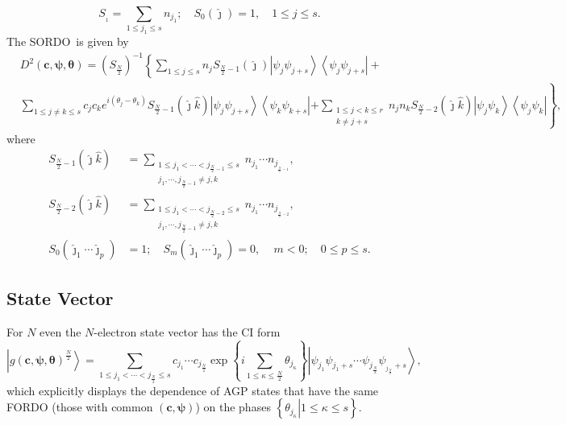 \documentclass[aps,preprint]{revtex4}%
\begin{document}
\begin{equation}
S_{_{1}}=\sum_{1\leq j_{1}\leq s}n_{j_{1}};\quad S_{0}\left(  \hat{\jmath
}\right)  =1,\quad1\leq j\leq s.
\end{equation}
The SORDO\ is given by
\begin{align}
&  D^{2}\left(  \boldsymbol{c},\boldsymbol{\psi},\boldsymbol{\theta}\right)
=\left(  S_{\frac{N}{2}}\right)  ^{-1}\left\{  \sum_{1\leq j\leq s}%
n_{j}S_{\frac{N}{2}-1}\left(  \hat{\jmath}\right)  \left\vert \psi_{j}%
\psi_{j+s}\right\rangle \left\langle \psi_{j}\psi_{j+s}\right\vert +\right.
\nonumber\\
&  \sum_{1\leq j\neq k\leq s}c_{j}c_{k}e^{i\left(  \theta_{j}-\theta
_{k}\right)  }S_{\frac{N}{2}-1}\left(  \hat{\jmath}\hat{k}\right)  \left\vert
\psi_{j}\psi_{j+s}\right\rangle \left\langle \psi_{k}\psi_{k+s}\right\vert
\left.  +\sum_{\substack{1\leq j<k\leq r\\k\neq j+s}}n_{j}n_{k}S_{\frac{N}%
{2}-2}\left(  \hat{\jmath}\hat{k}\right)  \left\vert \psi_{j}\psi
_{k}\right\rangle \left\langle \psi_{j}\psi_{k}\right\vert \right\}  ,
\end{align}
where
\begin{align}
S_{\frac{N}{2}-1}\left(  \hat{\jmath}\hat{k}\right)   &  =\sum
_{\substack{1\leq j_{1}<\cdots<j_{\frac{N}{2}-1}\leq s\\j_{1},\cdots
,j_{\frac{N}{2}-1}\neq j,k}}n_{j_{1}}\cdots n_{j_{_{\frac{N}{2}-1}}},\\
S_{\frac{N}{2}-2}\left(  \hat{\jmath}\hat{k}\right)   &  =\sum
_{\substack{1\leq j_{1}<\cdots<j_{\frac{N}{2}-2}\leq s\\j_{1},\cdots
,j_{\frac{N}{2}-1}\neq j,k}}n_{j_{1}}\cdots n_{j_{_{\frac{N}{2}-2}}},\\
S_{0}\left(  \hat{\jmath}_{1}\cdots\hat{\jmath}_{p}\right)   &  =1;\quad
S_{m}\left(  \hat{\jmath}_{1}\cdots\hat{\jmath}_{p}\right)  =0,\,\quad
m<0;\quad0\leq p\leq s.
\end{align}


\subsection{State Vector\label{StateVec}}

For $N$ even the $N$-electron state vector has the CI form
\begin{equation}
\left\vert g\left(  \boldsymbol{c},\boldsymbol{\psi},\boldsymbol{\theta
}\right)  ^{\frac{N}{2}}\right\rangle =\sum_{1\leq j_{1}<\cdots<j_{\frac{N}%
{2}}\leq s}c_{j_{1}}\cdots c_{j_{\frac{N}{2}}}\exp\left\{  i\sum
\limits_{1\leq\kappa\leq\frac{N}{2}}\theta_{j_{\kappa}}\right\}  \left\vert
\psi_{j_{1}}\psi_{j_{1}+s}\cdots\psi_{j_{\frac{N}{2}}}\psi_{_{j_{\frac{N}{2}}%
}+s}\right\rangle ,
\end{equation}
which explicitly displays the dependence of AGP states that have the same
FORDO (those with common $\left(  \boldsymbol{c},\boldsymbol{\psi}\right)  $)
on the phases $\left\{  \left.  \theta_{j_{\kappa}}\right\vert 1\leq\kappa\leq
s\right\}  $.
\end{document}
